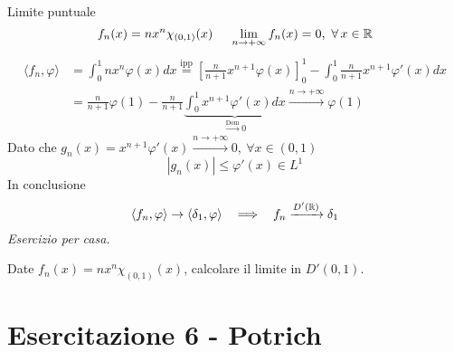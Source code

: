 Limite puntuale
\begin{equation*}
f_{n} (x) = nx^{n} \chi_{(0, 1)} (x)\ \ \ \ \lim\limits_{n\rightarrow + \infty} f_{n}(x) = 0, \ \forall x\in \RR
\end{equation*}
\begin{equation*}
\begin{aligned}
\langle f_{n}, \varphi \rangle & = \int^{1}_{0} nx^{n} \varphi (x) dx\overset{\text{ipp}}{=}\left[\frac{n}{n + 1} x^{n + 1} \varphi (x)\right]^{1}_{0} - \int^{1}_{0}\frac{n}{n + 1} x^{n + 1} \varphi '(x) dx\\
 & = \frac{n}{n + 1} \varphi (1) - \frac{n}{n + 1}\underbrace{\int^{1}_{0} x^{n + 1} \varphi '(x) dx}_{\xrightarrow{\text{Dom}} 0}\xrightarrow{n\rightarrow + \infty} \varphi (1)
\end{aligned}
\end{equation*}
Dato che $g_{n}(x) = x^{n + 1} \varphi '(x)\xrightarrow{n\rightarrow + \infty} 0, \ \forall x\in (0, 1)$
\begin{equation*}
| g_{n}(x)| \leq \varphi '(x) \in L^{1}
\end{equation*}
In conclusione
\begin{equation*}
\langle f_{n}, \varphi \rangle \rightarrow \langle \delta_{1}, \varphi \rangle \ \ \implies \ \ f_{n}\xrightarrow{D'(\RR)} \delta_{1}
\end{equation*}
\textit{Esercizio per casa.}

Date $f_{n}(x) = nx^{n} \chi_{(0, 1)}(x)$, calcolare il limite in $D'(0, 1)$.
\chapter{Esercitazione 6 - Potrich}
\ParteEsercizi
\Esercizio{}

